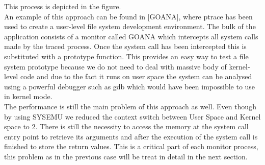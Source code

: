 This process is depicted in the figure. \\
An example of this approach can be found in [GOANA], where ptrace has been used to create a user-level file system development environment.  The bulk of the application consists of a monitor called GOANA which intercepts all system calls made by the traced process. Once the system call has been intercepted this is substituted with a prototype function.  This provides an easy way to test a file system prototype because we do not need to deal with massive body of kernel-level code and  due to the fact it runs on user space the system can be analysed using a powerful debugger such as gdb which would have been impossible to use in kernel mode. \\
The performance is still the main problem of this approach as well.   Even though by using SYSEMU we reduced the context switch between User Space and Kernel space to 2. There is still the necessity   to access the memory at the system call entry point to retrieve its arguments and after the execution of the system call is finished to store the return values. This is a critical part of each monitor process, this problem as in the previous case will be treat in detail in the next section. \\

